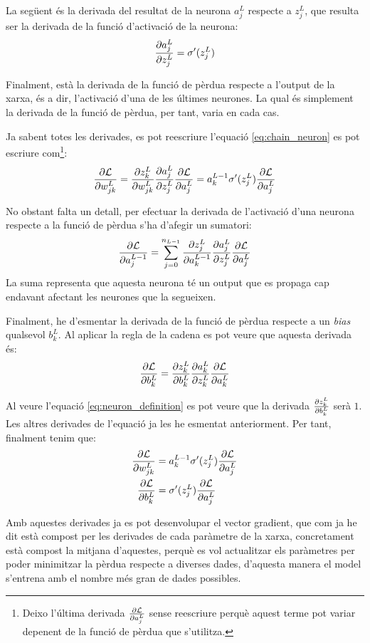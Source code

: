 La següent és la derivada del resultat de la neurona $a_j^L$ respecte a $z_j^L$, que resulta ser la derivada de la funció d'activació de la neurona:
\begin{equation*}
	\pdv{a_j^L}{z_j^L} = \sigma'(z_j^L)
\end{equation*}

Finalment, està la derivada de la funció de pèrdua respecte a l'output de la xarxa, és a dir, l'activació d'una de les últimes neurones. La qual és simplement la derivada de la funció de pèrdua, per tant, varia en cada cas.

Ja sabent totes les derivades, es pot reescriure l'equació \ref{eq:chain_neuron} es pot escriure com\footnote{Deixo l'última derivada $\pdv{\mathcal{L}}{a_j^L}$ sense reescriure perquè aquest terme pot variar depenent de la funció de pèrdua que s'utilitza.}:
$$
	\pdv{\mathcal{L}}{w_{jk}^L} = \pdv{z_k^L}{w_{jk}^L}\pdv{a_j^L}{z_j^L}\pdv{\mathcal{L}}{a_j^L} = 
	a^{L-1}_k \sigma'(z_j^L)\pdv{\mathcal{L}}{a_j^L}
$$

No obstant falta un detall, per efectuar la derivada de l'activació d'una neurona respecte a la funció de pèrdua s'ha d'afegir un sumatori:
$$
\pdv{\mathcal{L}}{a_j^{L-1}} = \sum_{j=0}^{n_{L-1}} \pdv{z_j^L}{a_k^{L-1}}\pdv{a_j^L}{z_j^L}\pdv{\mathcal{L}}{a_j^L}
$$
La suma representa que aquesta neurona té un output que es propaga cap endavant afectant les neurones que la segueixen.

Finalment, he d'esmentar la derivada de la funció de pèrdua respecte a un \textit{bias} qualsevol $ b^L_k$. Al aplicar la regla de la cadena es pot veure que aquesta derivada és:
\begin{equation*}
	\pdv{\mathcal{L}}{b^L_k} = \pdv{z^L_{k}}{b^L_{k}}\pdv{a^L_{k}}{z^L_{k}}\pdv{\mathcal{L}}{a^L_{k}}
\end{equation*}

Al veure l'equació \ref{eq:neuron_definition} es pot veure que la derivada $ \pdv{z^{L}_{k}}{b^{L}_{k}}$ serà $1$. Les altres derivades de l'equació ja les he esmentat anteriorment. Per tant, finalment tenim que:
\begin{align*}
	\pdv{\mathcal{L}}{w_{jk}^L} &= a^{L-1}_k \sigma'(z_j^L)\pdv{\mathcal{L}}{a_j^L} \\
	\pdv{\mathcal{L}}{b^L_k} &= \sigma'(z_j^L)\pdv{\mathcal{L}}{a_j^L}
\end{align*}

Amb aquestes derivades ja es pot desenvolupar el vector gradient, que com ja he dit està compost per les derivades de cada paràmetre de la xarxa, concretament està compost la mitjana d'aquestes, perquè es vol actualitzar els paràmetres per poder minimitzar la pèrdua respecte a diverses dades, d'aquesta manera el model s'entrena amb el nombre més gran de dades possibles.

